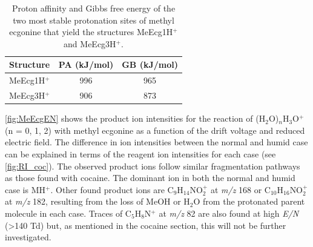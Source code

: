 %

\begin{table}[htbp]
\centering
\caption{Proton affinity and Gibbs free energy of the two most stable protonation sites of methyl ecgonine that yield the structures MeEcg1H$^+$ and MeEcg3H$^+$.}
\label{tb:me1}
\begin{tabular}{lcc}
\toprule
\textbf{Structure} &\textbf{PA (kJ/mol)} &\textbf{GB (kJ/mol)}\\ \toprule
MeEcg1H$^+$  & 996 &   965    \\
MeEcg3H$^+$  & 906 &   873    \\
\bottomrule
\end{tabular}
\end{table}

\autoref{fig:MeEcgEN} shows the product ion intensities  for the reaction of  (H$_2$O)$_n$H$_3$O$^+$ (n = 0, 1, 2) with  methyl ecgonine as a function of the drift voltage and reduced electric field.
%
The difference in ion intensities between the normal and humid case can be explained in terms of the reagent ion intensities for each case (see \autoref{fig:RI_coc}).
%
The observed product ions follow similar fragmentation pathways as those found with cocaine.
%
The dominant ion in both the normal and humid case is MH$^+$.
%
Other found product ions are C$_{9}$H$_{14}$NO$_2^+$ at \textit{m/z} 168 or C$_{10}$H$_{16}$NO$_2^+$ at \textit{m/z} 182, resulting from the loss of MeOH or H$_2$O from the protonated parent molecule in each case.
%
Traces of C$_5$H$_8$N$^+$ at \textit{m/z} 82 are also found at high \textit{E/N} (>140 Td) but, as mentioned in the cocaine section, this will not be further investigated.

